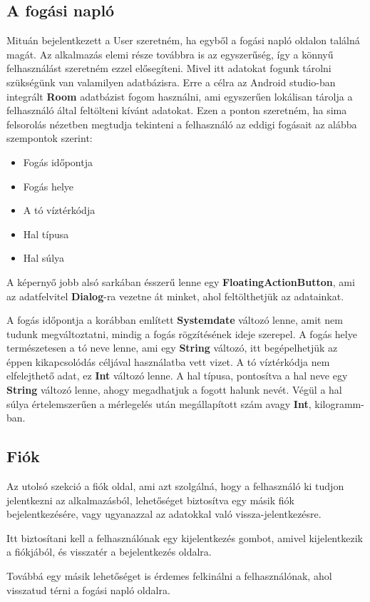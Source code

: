 \subsection{A fogási napló}

Mituán bejelentkezett a User szeretném, ha egyből a fogási napló oldalon találná magát. 
Az alkalmazás elemi része továbbra is az egyszerűség, így a könnyű felhasználást szeretném ezzel elősegíteni. Mivel itt adatokat fogunk tárolni szükségünk van valamilyen adatbázisra.
Erre a célra az Android studio-ban integrált \textbf{Room}\cite{room} adatbázist fogom használni, ami egyszerűen lokálisan tárolja a felhasználó által feltölteni kívánt adatokat.
Ezen a ponton szeretném, ha sima felsorolás nézetben megtudja tekinteni a felhasználó az eddigi fogásait az alábba szempontok szerint:
\begin{itemize}
    \item Fogás időpontja
    \item Fogás helye
    \item A tó víztérkódja
    \item Hal típusa
    \item Hal súlya
\end{itemize}

A képernyő jobb alsó sarkában ésszerű lenne egy \textbf{FloatingActionButton}, ami az adatfelvitel \textbf{Dialog}-ra vezetne át minket, ahol feltölthetjük az adatainkat.

A fogás időpontja a korábban említett \textbf{Systemdate} változó lenne, amit nem tudunk megváltoztatni, mindig a fogás rögzítésének ideje szerepel.
A fogás helye természetesen a tó neve lenne, ami egy \textbf{String} változó, itt begépelhetjük az éppen kikapcsolódás céljával használatba vett vizet.
A tó víztérkódja nem elfelejthető adat, ez \textbf{Int} változó lenne.
A hal típusa, pontosítva a hal neve egy \textbf{String} változó lenne, ahogy megadhatjuk a fogott halunk nevét.
Végül a hal súlya értelemszerűen a mérlegelés után megállapított szám avagy \textbf{Int}, kilogramm-ban.

\subsection{Fiók}

Az utolsó szekció a fiók oldal, ami azt szolgálná, hogy a felhasználó ki tudjon jelentkezni az alkalmazásból, lehetőséget biztosítva egy másik fiók bejelentkezésére, vagy ugyanazzal az adatokkal való vissza-jelentkezésre.

Itt biztosítani kell a felhasználónak egy kijelentkezés gombot, amivel kijelentkezik a fiókjából, és visszatér a bejelentkezés oldalra. 

Továbbá egy másik lehetőséget is érdemes felkinálni a felhasználónak, ahol visszatud térni a fogási napló oldalra.